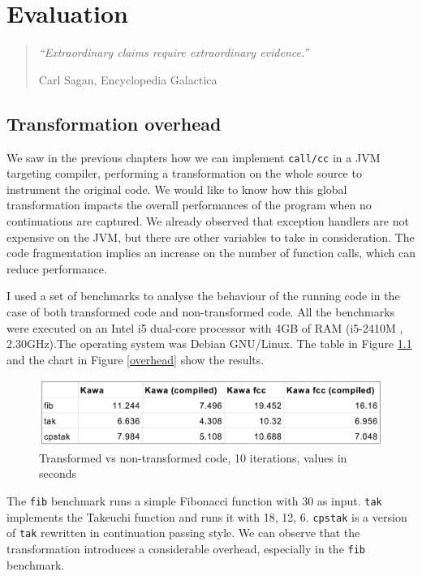 \documentclass[12pt,a4paper,oneside,openright]{book}
\begin{document}
\chapter{Evaluation}\label{evaluation}

\begin{quote}
\emph{``Extraordinary claims require extraordinary evidence.''}

\begin{flushright}
Carl Sagan, Encyclopedia Galactica
\end{flushright}
\end{quote}

\section{Transformation overhead}\label{transformation-overhead}

We saw in the previous chapters how we can implement \texttt{call/cc} in
a JVM targeting compiler, performing a transformation on the whole
source to instrument the original code. We would like to know how this
global transformation impacts the overall performances of the program
when no continuations are captured. We already observed that exception
handlers are not expensive on the JVM, but there are other variables to
take in consideration. The code fragmentation implies an increase on the
number of function calls, which can reduce performance.

I used a set of benchmarks to analyse the behaviour of the running code
in the case of both transformed code and non-transformed code. All the
benchmarks were executed on an Intel i5 dual-core processor with 4GB of
RAM (i5-2410M , 2.30GHz).The operating system was Debian GNU/Linux. The
table in Figure \ref{overhead-table} and the chart in Figure
\ref{overhead} show the results.

\begin{figure}[htbp]
\centering
\includegraphics{figures/overhead-table.pdf}
\caption{Transformed vs non-transformed code, 10 iterations, values in
seconds \label{overhead-table}}
\end{figure}

The \texttt{fib} benchmark runs a simple Fibonacci function with 30 as
input. \texttt{tak} implements the Takeuchi function and runs it with
18, 12, 6. \texttt{cpstak} is a version of \texttt{tak} rewritten in
continuation passing style. We can observe that the transformation
introduces a considerable overhead, especially in the \texttt{fib}
benchmark.
\end{document}
